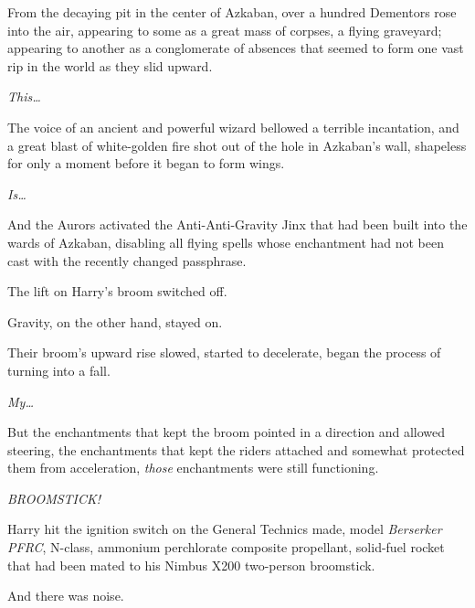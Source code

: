 From the decaying pit in the center of Azkaban, over a hundred Dementors rose 
into the air, appearing to some as a great mass of corpses, a flying graveyard; 
appearing to another as a conglomerate of absences that seemed to form one vast 
rip in the world as they slid upward.

\emph{This{\ldots}}

The voice of an ancient and powerful wizard bellowed a terrible incantation, 
and a great blast of white-golden fire shot out of the hole in Azkaban's wall, 
shapeless for only a moment before it began to form wings.

\emph{Is{\ldots}}

And the Aurors activated the Anti-Anti-Gravity Jinx that had been built into 
the wards of Azkaban, disabling all flying spells whose enchantment had not 
been cast with the recently changed passphrase.

The lift on Harry's broom switched off.

Gravity, on the other hand, stayed on.

Their broom's upward rise slowed, started to decelerate, began the process of 
turning into a fall.

\emph{My{\ldots}}

But the enchantments that kept the broom pointed in a direction and allowed 
steering, the enchantments that kept the riders attached and somewhat protected 
them from acceleration, \emph{those} enchantments were still functioning.

\emph{BROOMSTICK!}

Harry hit the ignition switch on the General Technics made, model 
\emph{Berserker PFRC}, N-class, ammonium perchlorate composite propellant, 
solid-fuel rocket that had been mated to his Nimbus X200 two-person broomstick.

And there was noise.